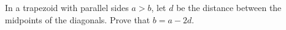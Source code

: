 In a trapezoid with parallel sides $a>b$, let $d$ be the distance between the midpoints of the diagonals. Prove that $b=a-2d$.
